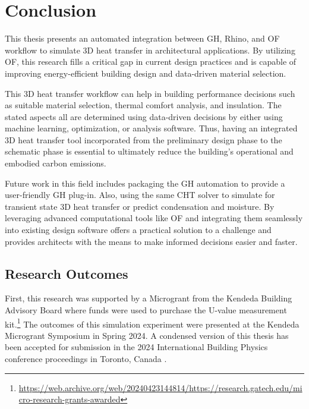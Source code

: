 \chapter{Conclusion}
This thesis presents an automated integration between  \gls{GH}, Rhino, and \gls{OF} workflow to simulate 3D heat transfer in architectural applications. 
By utilizing \gls{OF}, this research fills a critical gap in current design practices and is capable of improving energy-efficient building design and data-driven material selection. 

This 3D heat transfer workflow can help in building performance decisions such as suitable material selection, thermal comfort analysis, and insulation.
The stated aspects all are determined using data-driven decisions by either using machine learning, optimization, or analysis software. Thus, having an integrated 3D heat transfer tool incorporated from the preliminary design phase to the schematic phase is essential to ultimately reduce the building's operational and embodied carbon emissions. 

Future work in this field includes packaging the  \gls{GH} automation to provide a user-friendly  \gls{GH} plug-in. Also, using the same CHT solver to simulate for transient state 3D heat transfer or predict condensation and moisture. By leveraging advanced computational tools like  \gls{OF} and integrating them seamlessly into existing design software offers a practical solution to a challenge and provides architects with the means to make informed decisions easier and faster. 

\section*{Research Outcomes}
First, this research was supported by a Microgrant from the Kendeda Building Advisory Board  \cite{kendeda} where funds were used to purchase the U-value measurement kit.\footnote{\url{https://web.archive.org/web/20240423144814/https://research.gatech.edu/micro-research-grants-awarded}}
The outcomes of this simulation experiment were presented at the Kendeda Microgrant Symposium in Spring 2024. 
A condensed version of this thesis has been accepted for submission in the 2024 International Building Physics conference proceedings in Toronto, Canada \cite{ibpc}. 






